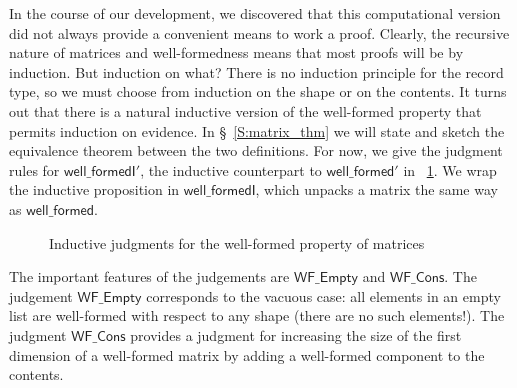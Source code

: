 \documentclass[11pt,conference]{IEEEtran}
\newcommand{\var}[1]{\mathit{#1}}
\newcommand{\func}[1]{\mathsf{#1}}
\newcommand{\iname}[1]{\textsf{#1}}
\theoremstyle{plain} %
\theoremstyle{definition}
\theoremstyle{remark}
\begin{document}
In the course of our development, we discovered that this computational version
did not always provide a convenient means to work a proof. Clearly, the
recursive nature of matrices and well-formedness means that most proofs will be
by induction. But induction on what? There is no induction principle for the
record type, so we must choose from induction on the shape or on the contents.
It turns out that there is a natural inductive version of the well-formed
property that permits induction on evidence. In \S~\ref{S:matrix_thm} we will
state and sketch the equivalence theorem between the two definitions. For now,
we give the judgment rules for \(\func{well\_formedI'}\), the inductive
counterpart to \(\func{well\_formed'}\) in \figurename~\ref{F:wfI}. We wrap the
inductive proposition in \(\func{well\_formedI}\), which unpacks a matrix the
same way as \(\func{well\_formed}\).

\begin{figure}[ht]
    \centering
    \caption{Inductive judgments for the well-formed property of
    matrices}\label{F:wfI}
\end{figure}

The important features of the judgements are \(\iname{WF\_Empty}\) and
\(\iname{WF\_Cons}\). The judgement \(\iname{WF\_Empty}\) corresponds to the
vacuous case: all elements in an empty list are well-formed with respect to any
shape (there are no such elements!). The judgment \(\iname{WF\_Cons}\) provides
a judgment for increasing the size of the first dimension of a well-formed
matrix by adding a well-formed component to the contents.
\end{document}
